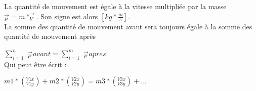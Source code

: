 La quantité de mouvement est égale à la vitesse multipliée par la masse
$_{P}^{\rightarrow} = m * _{V}^{\rightarrow}$.
Son signe est alors $[kg*\frac{m}{s}]$.
\\
La somme des quantité de mouvement avant sera toujours égale à la somme des quantité de mouvement après

$\sum_{i=1}^{n}$ $_{P}^{\rightarrow}avant = $$\sum_{i=1}^{m}$ $_{P}^{\rightarrow}apres$
\\
Qui peut être écrit : 

$m1 * (_{V1y}^{V1x}) + m2 * (_{V2y}^{V2x}) = m3 * (_{V3y}^{V3x}) + ...$
